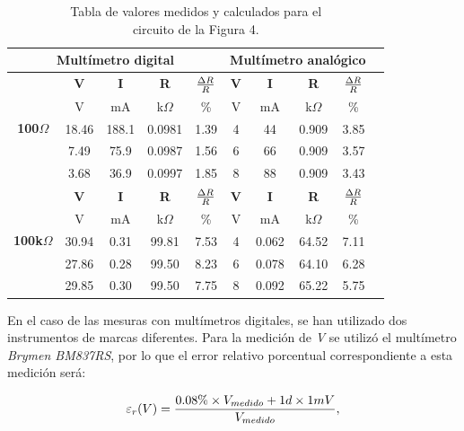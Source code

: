 \documentclass{article}
\begin{document}
\begin{table}[!hbt]
	\begin{center}

		\begin{tabular}{|c|c|c|c|c|c|c|c|c|c|} \hline
			\multicolumn{5}{|c|}{\textbf{Multímetro digital}} & \multicolumn{4}{c|}{\textbf{Multímetro analógico}} \\ \hline
			\multirow{5}{*}{\textbf{100$\Omega$}} 
			& \textbf{V} & \textbf{I} & \textbf{R} & \textbf{${\Delta R \over R}$} & \textbf{V} & \textbf{I} & \textbf{R} & \textbf{${\Delta R \over R}$} \\\cline{2-9}
			& V & mA & k$\Omega$ & \% & V & mA & k$\Omega$ & \% \\\cline{2-9}
			& 18.46 & 188.1 & 0.0981 & 1.39 & 4 & 44 & 0.909 & 3.85 \\\cline{2-9}
			& 7.49 & 75.9 & 0.0987 & 1.56 & 6 & 66 & 0.909 & 3.57 \\\cline{2-9}
			& 3.68 & 36.9 & 0.0997 & 1.85 & 8 & 88 & 0.909 &  3.43 \\ \hline
			\multirow{5}{*}{\textbf{100k$\Omega$}} 
			& \textbf{V} & \textbf{I} & \textbf{R} & \textbf{${\Delta R \over R}$} & \textbf{V} & \textbf{I} & \textbf{R} & \textbf{${\Delta R \over R}$} \\\cline{2-9}
			& V & mA & k$\Omega$ & \% & V & mA & k$\Omega$ & \% \\\cline{2-9}
			& 30.94 & 0.31 & 99.81 & 7.53 & 4 & 0.062 & 64.52 & 7.11 \\\cline{2-9}
			& 27.86 & 0.28 & 99.50 & 8.23 & 6 & 0.078 & 64.10 & 6.28 \\\cline{2-9}
			& 29.85 & 0.30 & 99.50 & 7.75 & 8 & 0.092 & 65.22 & 5.75 \\ \hline
		\end{tabular}

	\caption{Tabla de valores medidos y calculados para el\\ circuito de la Figura 4.}
	\end{center}
\end{table}
\bigskip


	En el caso de las mesuras con multímetros digitales, se han utilizado dos instrumentos de marcas diferentes. Para la medición de \textit{V} se utilizó el multímetro \textit{Brymen BM837RS}, por lo que el error relativo porcentual correspondiente a esta medición será:
\medskip

\begin{equation}
 	\varepsilon_r(V) = {0.08\%\times V_{medido} + 1d\times 1mV \over V_{medido}},
\end{equation}
\medskip
\end{document}
